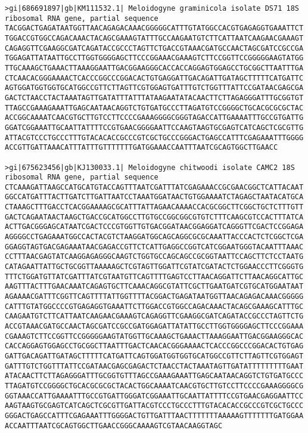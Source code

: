 \documentclass[11pt]{article}
\begin{document}
\begin{Verbatim}[commandchars=\\\{\}]
>gi|686691897|gb|KM111532.1| Meloidogyne graminicola isolate DS71 18S ribosomal RNA gene, partial sequence
TACGGACTGAGATAATGGTTAACAGAGACAAACGGGGGCATTTGTATGGCCACGTGAGAGGTGAAATTCT
TGGACCGTGGCCAGACAAACTACAGCGAAAGTATTTGCCAAGAATGTCTTCATTAATCAAGAACGAAAGT
CAGAGGTTCGAAGGCGATCAGATACCGCCCTAGTTCTGACCGTAAACGATGCCAACTAGCGATCCGCCGA
TGGAGATTATAATTGCCTTGGTGGGGAGCTTCCCGGAAACGAAAGTCTTCCGGTTCCGGGGGAAGTATGG
TTGCAAAGCTGAAACTTAAAGGAATTGACGGAAGGGCACCACCAGGAGTGGAGCCTGCGGCTTAATTTGA
CTCAACACGGGAAAACTCACCCGGCCCGGACACTGTGAGGATTGACAGATTGATAGCTTTTTCATGATTC
AGTGGATGGTGGTGCATGGCCGTTCTTAGTTCGTGGAGTGATTTGTCTGGTTTATTCCGATAACGAGCGA
GACTCTAACCTACTAAATAGTTGATATTTATTTATAAGAATATACAACTTCTTAGAGGGATTTGCGGTGT
TTAGCCGAAAGAAATTGAGCAATAACAGGTCTGTGATGCCCTTAGATGTCCGGGGCTGCACGCGCGCTAC
ACCGGCAAAATCAACGTGCTTGTCCTTCCCCGAAAGGGGCGGGTAGACCATTGAAAATTTGCCGTGATTG
GGATCGGAAATTGCAATTATTTTCCGTGAACGGGGAATTCCAAGTAAGTGCGAGTCATCAGCTCGCGTTG
ATTACGTCCCTGCCCTTTGTACACACCGCCCGTCGCTGCCCGGGACTGAGCCATTTCGAGAAATTTGGGG
ACCGTTGATTAAACATTTATTTGTTTTTTTGATGGAAACCAATTTAATCGCAGTGGCTTGAACC

>gi|675623456|gb|KJ130033.1| Meloidogyne chitwoodi isolate CAMC2 18S ribosomal RNA gene, partial sequence
CTCAAAGATTAAGCCATGCATGTACCAGTTTAATCGATTTATCGAGAAACCGCGAACGGCTCATTACAAT
GGCCATGATTTACTTGATCTTGATTAATCCTAAATGGATAACTGTGGAAAATCTAGAGCTAATACATGCA
CTAAAGCTTTGACCTCACGGAAAAGCGCATTTATTAGAACAAAACCACGCGGCTTCGGCTGCTCTTTGTT
GACTCAGAATAACTAAGCTGACCGCATGGCCTTGTGCCGGCGGCGTGTCTTTCAAGCGTCCACTTTATCA
ACTTGACGGGAGCATAATCGACTCCCGTGGTTGTGACGGATAACGGAGGATCAGGGTTCGACTCCGGAGA
AGGGGCCTGAGAAATGGCCACTACGTCTAAGGATGGCAGCAGGCGCGCAAATTACCCACTCTCGGCTCGA
GGAGGTAGTGACGAGAAATAACGAGACCGTTCTCATTGAGGCCGGTCATCGGAATGGGTACAATTTAAAC
CCTTTAACGAGTATCAAGGAGAGGGCAAGTCTGGTGCCAGCAGCCGCGGTAATTCCAGCTTCTCCTAATG
CATAGAATTATTGCTGCGGTTAAAAAGCTCGTAGTTGGATTCGTATCGATACTCTGGAACCCTTCGGGTG
TTTCTGGATGTTATCGATTTATCGTAATGTTCAGTTTTGAGTCCTTAACAGGATTCTTAACAGGCATTGC
AAGTTTACTTTGAACAAATCAGAGTGCTTCAAACAGGCGTATTCGCTTGAATGATCGTGCATGGAATAAT
AGAAAACGATTTCGGTTCAGTTTTATTGGTTTTACGGACTGAGATAATGGTTAACAGAGACAAACGGGGG
CATTTGTATGGCCCCGTGAGAGGTGAAATTCTTGGACCGTGGCCAGACAAACTACAGCGAAAGCATTTGC
CAAGAATGTCTTCATTAATCAAGAACGAAAGTCAGAGGTTCGAAGGCGATCAGATACCGCCCTAGTTCTG
ACCGTAAACGATGCCAACTAGCGATCCGCCGATGGAGATTATATTGCCTTGGTGGGGAGCTTCCCGGAAA
CGAAAGTCTTCCGGTTCCGGGGGAAGTATGGTTGCAAAGCTGAAACTTAAAGGAATTGACGGAAGGGCAC
CACCAGGAGTGGAGCCTGCGGCTTAATTTGACTCAACACGGGAAAACTCACCCGGCCCGGACACTGTGAG
GATTGACAGATTGATAGCTTTTTCATGATTCAGTGGATGGTGGTGCATGGCCGTTCTTAGTTCGTGGAGT
GATTTGTCTGGTTTATTCCGATAACGAGCGAGACTCTAACCTACTAAATAGTTGATATTTTTTTTTGAAT
ATACAACTTCTTAGAGGGATTTGCGGTGTTTAGCCGAAAGAAATTGAGCAATAACAGGTCTGTGATGCCC
TTAGATGTCCGGGGCTGCACGCGCGCTACACTGGCAAAATCAACGTGCTTGTCCTTCCCCGAAAGGGGCG
GGTAAACCATTGAAAATTTGCCGTGATTGGGATCGGAAATTGCAATTATTTTCCGTGAACGAGGAATTCC
AAGTAAGTGCGAGTCATCAGCTCGCGTTGATTACGTCCCTGCCCTTTGTACACACCGCCCGTCGCTGCCC
GGGACTGAGCCATTTCGAGAAATTTGGGGACTGTTGATTTAACTTTTTTTAAAAAGTTTTTTTGATGGAA
ACCAATTTAATCGCAGTGGCTTGAACCGGGCAAAAGTCGTAACAAGGTAGC


\end{Verbatim}
\end{document}

